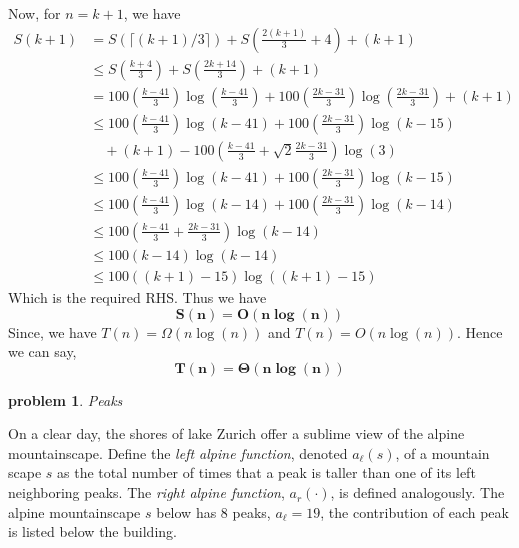\documentclass[11pt]{article}
\newtheorem{problem}{\sc\color{cit}problem}
\begin{document}
\begin{enumerate}
    \noindent Now, for $n=k+1$, we have
    \begin{equation}
        \begin{split}
           S(k+1) &= S(\lceil (k+1)/3 \rceil) + S\left(\frac{2(k+1)}{3} +4\right)+(k+1)\\
           &\leq S\left(\frac{k+4}{3}\right) + S\left(\frac{2k+14}{3} \right)+(k+1)\\
           &= 100\left(\frac{k-41}{3}\right)\log\left(\frac{k-41}{3}\right) + 100\left(\frac{2k-31}{3}\right)\log\left(\frac{2k-31}{3}\right)+(k+1)\\
           &\leq 100\left(\frac{k-41}{3}\right)\log(k-41) + 100\left(\frac{2k-31}{3}\right)\log(k-15)\\
           &\quad +(k+1)-100\left(\frac{k-41}{3}+\sqrt{2}\frac{2k-31}{3}\right)\log(3)\\
           &\leq 100\left(\frac{k-41}{3}\right)\log(k-41) + 100\left(\frac{2k-31}{3}\right)\log(k-15)\\
           &\leq 100\left(\frac{k-41}{3}\right)\log(k-14) + 100\left(\frac{2k-31}{3}\right)\log(k-14)\\
           &\leq 100\left(\frac{k-41}{3}+\frac{2k-31}{3}\right)\log(k-14)\\
           &\leq 100(k-14)\log(k-14)\\
           &\leq 100((k+1)-15)\log((k+1)-15)
        \end{split}
    \end{equation}
    Which is the required RHS. Thus we have
    $$\mathbf{S(n) = O(n\log(n))}$$
    Since, we have $T(n) = \Omega(n\log(n))$ and $T(n) = O(n\log(n))$.
    Hence we can say,
    $$\mathbf{T(n) = \Theta(n\log(n))}$$
\end{enumerate}




\newpage

\begin{problem}Peaks\end{problem}
On a clear day, the shores of lake Zurich offer a sublime view of the alpine mountainscape.  Define the \emph{left alpine function}, denoted $a_{\ell}(s)$,
of a mountain scape $s$ as the total number of times that a peak is taller than one of its left neighboring peaks. The \emph{right alpine function}, $a_r(\cdot)$, is defined analogously. The alpine mountainscape $s$ below
has 8 peaks, $a_\ell = 19$, the contribution of each peak is listed below the building.
\end{document}
